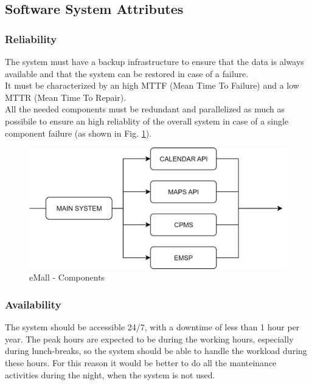 \documentclass[table, 12pt]{article} %
\begin{document}
    \subsection{Software System Attributes}
    \subsubsection{Reliability}
    The system must have a backup infrastructure to ensure that the data is always available and that the system can be restored in case of a failure.\\
    It must be characterized by an high MTTF (Mean Time To Failure) and a low MTTR (Mean Time To Repair).\\
    All the needed components must be redundant and parallelized as much as possibile to ensure an high reliablity of the overall system in case of a single component failure (as shown in Fig. \ref{fig: components of eMall }).

    \begin{figure}[H]
        \includegraphics[scale=0.70, center]{assets/componentDiag.png}
        \caption{eMall - Components}
        \label{fig: components of eMall }
    \end{figure}

    \subsubsection{Availability}
    The system should be accessible 24/7, with a downtime of less than 1 hour per year.
    The peak hours are expected to be during the working hours, especially during lunch-breaks, so the system should be able to handle the workload during these hours.
    For this reason it would be better to do all the manteinance activities during the night, when the system is not used.
\end{document}

